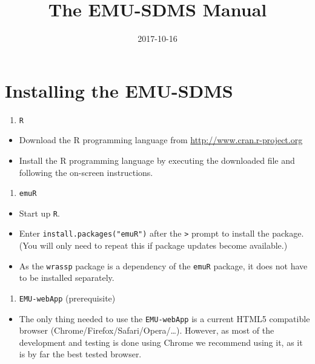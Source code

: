 \documentclass[]{book}
\title{The EMU-SDMS Manual}
\author{}
\date{2017-10-16}
\providecommand{\tightlist}{%
  \setlength{\itemsep}{0pt}\setlength{\parskip}{0pt}}
\theoremstyle{definition}
\theoremstyle{definition}
\theoremstyle{definition}
\theoremstyle{remark}
\begin{document}
\maketitle

{
\setcounter{tocdepth}{1}
\tableofcontents
}
\chapter{Installing the EMU-SDMS}\label{installing-the-emu-sdms}

\begin{enumerate}
\def\labelenumi{\arabic{enumi}.}
\tightlist
\item
  \texttt{R}
\end{enumerate}

\begin{itemize}
\tightlist
\item
  Download the R programming language from
  \href{www.cran.r-project.org}{http://www.cran.r-project.org}
\item
  Install the R programming language by executing the downloaded file
  and following the on-screen instructions.
\end{itemize}

\begin{enumerate}
\def\labelenumi{\arabic{enumi}.}
\setcounter{enumi}{1}
\tightlist
\item
  \texttt{emuR}
\end{enumerate}

\begin{itemize}
\tightlist
\item
  Start up \texttt{R}.
\item
  Enter \texttt{install.packages("emuR")} after the
  \texttt{\textgreater{}} prompt to install the package. (You will only
  need to repeat this if package updates become available.)
\item
  As the \texttt{wrassp} package is a dependency of the \texttt{emuR}
  package, it does not have to be installed separately.
\end{itemize}

\begin{enumerate}
\def\labelenumi{\arabic{enumi}.}
\setcounter{enumi}{2}
\tightlist
\item
  \texttt{EMU-webApp} (prerequisite)
\end{enumerate}

\begin{itemize}
\tightlist
\item
  The only thing needed to use the \texttt{EMU-webApp} is a current
  HTML5 compatible browser (Chrome/Firefox/Safari/Opera/\ldots{}).
  However, as most of the development and testing is done using Chrome
  we recommend using it, as it is by far the best tested browser.
\end{itemize}
\end{document}
